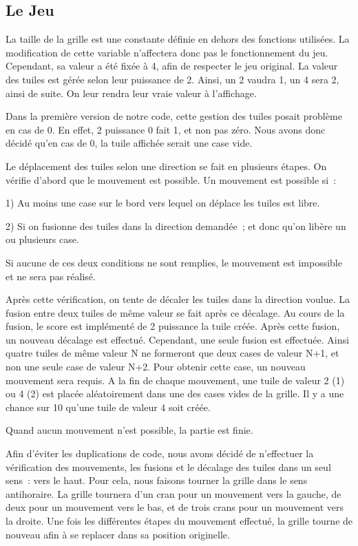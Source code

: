 \documentclass[12pt]{report}
\begin{document}
\subsection{Le Jeu}
La taille de la grille est une constante définie en dehors des fonctions utilisées. La modification de cette variable n’affectera donc pas le fonctionnement du jeu. Cependant, sa valeur a été fixée à 4, afin de respecter le jeu original. La valeur des tuiles est gérée selon leur puissance de 2. Ainsi, un 2 vaudra 1, un 4 sera 2, ainsi de suite. On leur rendra leur vraie valeur à l’affichage.

Dans la première version de notre code, cette gestion des tuiles posait problème en cas de 0. En effet, 2 puissance 0 fait 1, et non pas zéro. Nous avons donc décidé qu’en cas de 0, la tuile affichée serait une case vide.

Le déplacement des tuiles selon une direction se fait en plusieurs étapes. 
On vérifie d’abord que le mouvement est possible. Un mouvement est possible si :

1) Au moins une case sur le bord vers lequel on déplace les tuiles est libre.

2) Si on fusionne des tuiles dans la direction demandée ; et donc qu’on libère un ou plusieurs case.

Si aucune de ces deux conditions ne sont remplies, le mouvement est impossible et ne sera pas réalisé.

Après cette vérification, on tente de décaler les tuiles dans la direction voulue. La fusion entre deux tuiles de même valeur se fait après ce décalage. Au cours de la fusion, le score est implémenté de 2 puissance la tuile créée. Après cette fusion, un nouveau décalage est effectué. Cependant, une seule fusion est effectuée. Ainsi quatre tuiles de même valeur N ne formeront que deux cases de valeur N+1, et non une seule case de valeur N+2. Pour obtenir cette case, un nouveau mouvement sera requis. A la fin de chaque mouvement, une tuile de valeur 2 (1)  ou 4 (2) est placée aléatoirement dans une des cases vides de la grille. Il y a une chance sur 10 qu’une tuile de valeur 4 soit créée.

Quand aucun mouvement n’est possible, la partie est finie. 

Afin d’éviter les duplications de code, nous avons décidé de n’effectuer la vérification des mouvements, les fusions et le décalage des tuiles dans un seul sens : vers le haut. Pour cela, nous faisons tourner la grille dans le sens antihoraire. La grille tournera d’un cran pour un mouvement vers la gauche, de deux pour un mouvement vers le bas, et de trois crans pour un mouvement vers la droite. Une fois les différentes étapes du mouvement effectué, la grille tourne de nouveau afin à se replacer dans sa position originelle.
\end{document}
